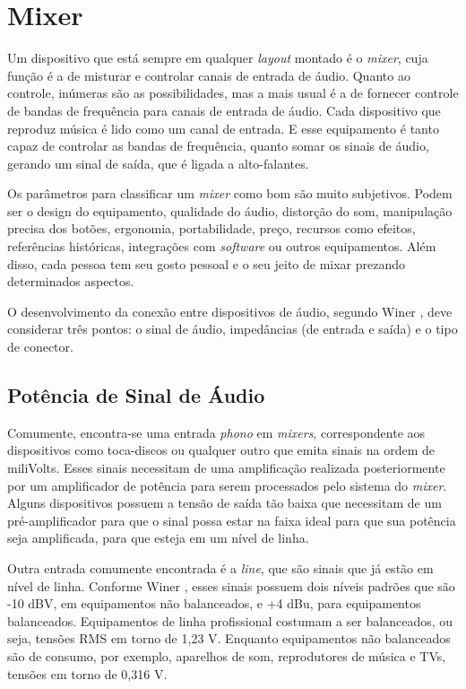 \section{Mixer}
Um dispositivo que está sempre em qualquer \textit{layout} montado é o \textit{mixer}, cuja função é a de misturar e controlar canais de entrada de áudio. Quanto ao controle, inúmeras são as possibilidades, mas a mais usual é a de fornecer controle de bandas de frequência para canais de entrada de áudio. Cada dispositivo que reproduz música é lido como um canal de entrada. E esse equipamento é tanto capaz de controlar as bandas de frequência, quanto somar os sinais de áudio, gerando um sinal de saída, que é ligada a alto-falantes. 
\par
Os parâmetros para classificar um \textit{mixer} como bom são muito subjetivos. Podem ser o design do equipamento, qualidade do áudio, distorção do som, manipulação precisa dos botões, ergonomia, portabilidade, preço, recursos como efeitos, referências históricas, integrações com \textit{software} ou outros equipamentos. Além disso, cada pessoa tem seu gosto pessoal e o seu jeito de mixar prezando determinados aspectos.
\par
O desenvolvimento da conexão entre dispositivos de áudio, segundo Winer \cite{winer}, deve considerar três pontos: o sinal de áudio, impedâncias (de entrada e saída) e o tipo de conector.

\subsection{Potência de Sinal de Áudio}

Comumente, encontra-se uma entrada \textit{phono} em \textit{mixers}, correspondente aos dispositivos como toca-discos ou qualquer outro que emita sinais na ordem de miliVolts. Esses sinais necessitam de uma amplificação realizada posteriormente por um amplificador de potência para serem processados pelo sistema do \textit{mixer}. Alguns dispositivos possuem a tensão de saída tão baixa que necessitam de um pré-amplificador para que o sinal possa estar na faixa ideal para que sua potência seja amplificada, para que esteja em um nível de linha.
\par
Outra entrada comumente encontrada é a \textit{line}, que são sinais que já estão em nível de linha. Conforme Winer \cite{winer}, esses sinais possuem dois níveis padrões que são -10 dBV, em equipamentos não balanceados, e +4 dBu, para equipamentos balanceados. Equipamentos de linha profissional costumam a ser balanceados, ou seja, tensões RMS em torno de 1,23 V. Enquanto equipamentos não balanceados são de consumo, por exemplo, aparelhos de som, reprodutores de música e TVs, tensões em torno de 0,316 V.

